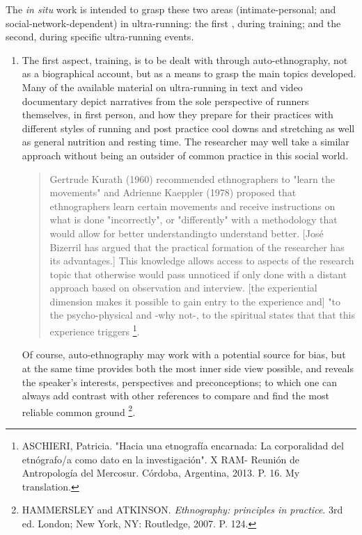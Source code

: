 The \textit{in situ} work is intended to grasp these two areas (intimate-personal; and social-network-dependent) in ultra-running: the first , during training; and the second, during specific ultra-running events.

\begin{enumerate}
 \item The first aspect, training, is to be dealt with  through auto-ethnography, not as a biographical account, but as a means to grasp the main topics developed. Many of the available material on ultra-running in text and video documentary depict narratives from the sole perspective of runners themselves, in first person, and how they prepare for their practices with different styles of running and post practice cool downs and stretching as well as general nutrition and resting time. The researcher may well take a similar approach without being an outsider of common practice in this social world.
 
 \begin{quote}
  Gertrude Kurath (1960) recommended ethnographers to "learn the movements" and Adrienne Kaeppler (1978) proposed that ethnographers learn certain movements and  receive instructions on  what is done "incorrectly", or "differently" with a methodology that would allow for better understandingto understand better. [José Bizerril has argued that the practical formation of the researcher has its advantages.] This knowledge allows  access to aspects of the research topic that otherwise would pass unnoticed if only done with a distant approach based on observation and interview. [the experiential dimension makes it possible to gain entry to the experience and] "to the psycho-physical and -why not-, to the spiritual states that that this experience triggers%
  \footnote{ASCHIERI, Patricia. "Hacia una etnografía encarnada: La corporalidad del etnógrafo/a como dato en la investigación". X RAM- Reunión de Antropología del Mercosur. Córdoba, Argentina, 2013. P. 16. My translation.}.
 \end{quote}
 
 Of course,  auto-ethnography may work with a potential source for bias, but at the same time provides both the most inner side view possible, and reveals the speaker's interests, perspectives and preconceptions; to which one can always add contrast with other references to compare and find the most reliable common ground%
 \footnote{HAMMERSLEY and ATKINSON. \textit{Ethnography: principles in practice}. 3rd ed. London; New York, NY: Routledge, 2007. P.%
 124.}.
 

\end{enumerate}
